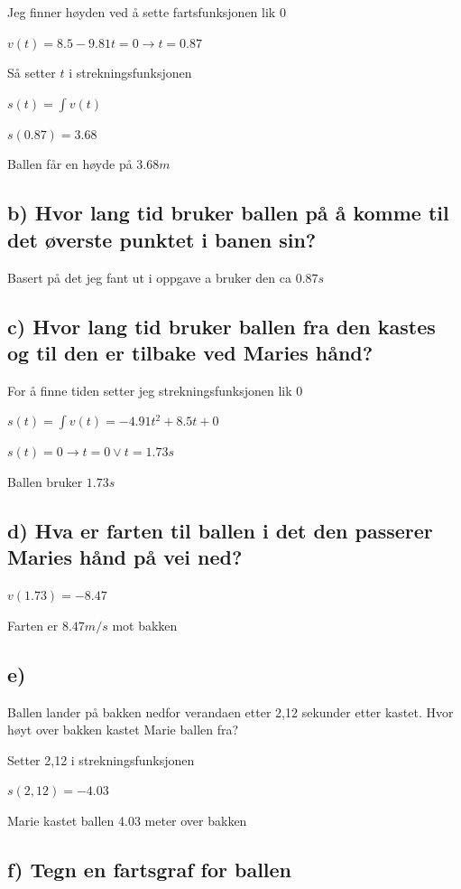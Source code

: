 \documentclass{article}
\begin{document}
Jeg finner høyden ved å sette fartsfunksjonen lik 0

$v(t) = 8.5 - 9.81 t = 0 \rightarrow t = 0.87$

Så setter $t$ i strekningsfunksjonen

$s(t) = \int v(t)$

$s(0.87) = 3.68$

Ballen får en høyde på $3.68m$

\subsection{b) Hvor lang tid bruker ballen på å komme til det øverste punktet i banen sin?}

Basert på det jeg fant ut i oppgave a bruker den ca $0.87s$

\subsection{c) Hvor lang tid bruker ballen fra den kastes og til den er tilbake ved Maries hånd?}

For å finne tiden setter jeg strekningsfunksjonen lik 0

$s(t) = \int v(t) = -4.91 t^2 + 8.5t + 0$

$s(t) = 0 \rightarrow t = 0 \lor t = 1.73s$

Ballen bruker $1.73s$

\subsection{d) Hva er farten til ballen i det den passerer Maries hånd på vei ned?}

$v(1.73) = -8.47$

Farten er $8.47 m/s$ mot bakken

\subsection{e)} Ballen lander på bakken nedfor verandaen etter 2,12 sekunder etter kastet. Hvor høyt over bakken kastet Marie ballen fra?

Setter 2,12 i strekningsfunksjonen

$s(2,12) = -4.03$

Marie kastet ballen 4.03 meter over bakken

\subsection{f) Tegn en fartsgraf for ballen}
\end{document}
